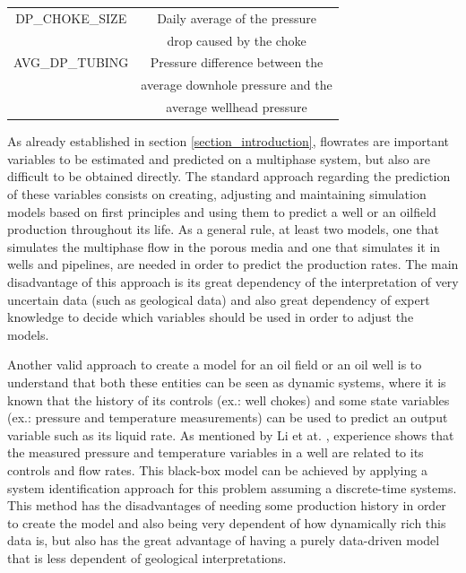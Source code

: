 \documentclass[conference]{IEEEtran}
\begin{document}
\begin{table}[htbp]
\begin{center}
\begin{tabular}{|c|c|}
\hline
DP\_CHOKE\_SIZE            &   Daily average of the pressure \\
                           &   drop caused by the choke \\
\hline
AVG\_DP\_TUBING            &   Pressure difference between the\\
                           &   average downhole pressure and the \\
                           &   average wellhead pressure \\
\hline
\end{tabular}
\label{volve_variables}
\end{center}
\end{table}

As already established in section \ref{section_introduction}, flowrates are important variables 
to be estimated and predicted on a multiphase system, but also are difficult to be obtained 
directly. The standard approach regarding the prediction of these variables consists on 
creating, adjusting and maintaining simulation models based on first principles and using them 
to predict a well or an oilfield production throughout its life. As a general rule, at least 
two models, one that simulates the multiphase flow in the porous media and one that simulates 
it in wells and pipelines, are needed in order to predict the production rates. The main 
disadvantage of this approach is its great dependency of the interpretation of very uncertain 
data (such as geological data) and also great dependency of expert knowledge to decide which 
variables should be used in order to adjust the models.

Another valid approach to create a model for an oil field or an oil well is to understand that 
both these entities can be seen as dynamic systems, where it is known that the history of its 
controls (ex.: well chokes) and some state variables (ex.: pressure and temperature measurements) 
can be used to predict an output variable such as its liquid rate. As mentioned by Li et at. 
\cite{Li2019}, experience shows that the measured pressure and temperature variables in a well 
are related to its controls and flow rates. This black-box model can be achieved by applying a 
system identification approach for this problem assuming a discrete-time systems. This method 
has the disadvantages of needing some production history in order to create the model and also 
being very dependent of how dynamically rich this data is, but also has the great advantage of 
having a purely data-driven model that is less dependent of geological interpretations.
\end{document}
